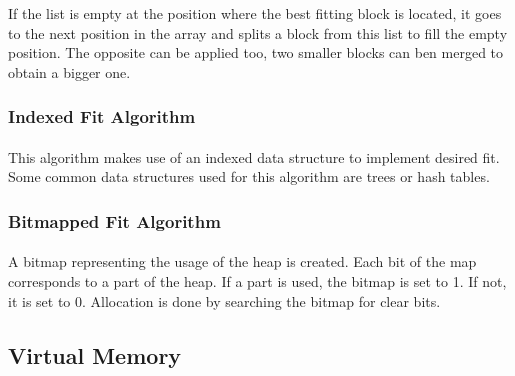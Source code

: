 If the list is empty at the position where the best fitting block is located, it goes to the next position in the array
and splits a block from this list to fill the empty position.
The opposite can be applied too, two smaller blocks can ben merged to obtain a bigger one.

\subsubsection{Indexed Fit Algorithm}
\paragraph{}
This algorithm makes use of an indexed data structure to implement desired fit.
Some common data structures used for this algorithm are trees or hash tables.

\subsubsection{Bitmapped Fit Algorithm}
\paragraph{}
A bitmap representing the usage of the heap is created.
Each bit of the map corresponds to a part of the heap.
If a part is used, the bitmap is set to 1.
If not, it is set to 0.
Allocation is done by searching the bitmap for clear bits.


\subsection{Virtual Memory}